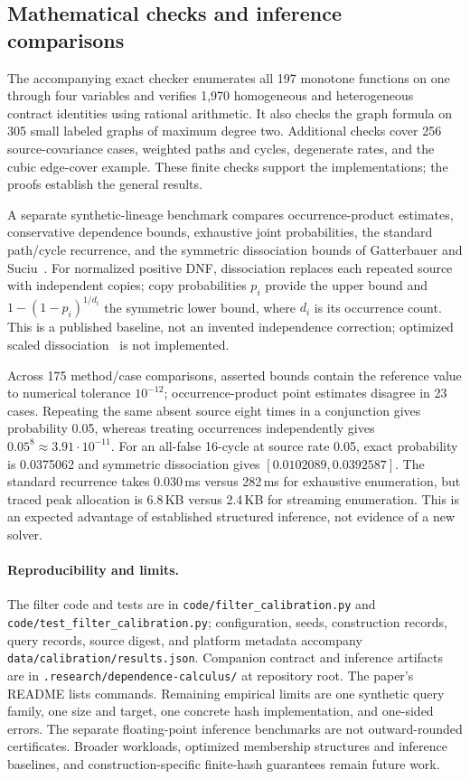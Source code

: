 \documentclass[../main.tex]{subfiles}
\begin{document}
\subsection{Mathematical checks and inference comparisons}
The accompanying exact checker enumerates all 197 monotone functions on
one through four variables and verifies 1,970 homogeneous and heterogeneous
contract identities using rational arithmetic. It also checks the graph
formula on 305 small labeled graphs of maximum degree two. Additional
checks cover 256 source-covariance cases, weighted paths and cycles,
degenerate rates, and the cubic edge-cover example. These finite checks
support the implementations; the proofs establish the general results.

A separate synthetic-lineage benchmark compares occurrence-product
estimates, conservative dependence bounds, exhaustive joint probabilities,
the standard path/cycle recurrence, and the symmetric dissociation bounds
of Gatterbauer and Suciu~\cite{gatterbauer2014bounds}. For normalized positive
DNF, dissociation replaces each repeated source with independent copies;
copy probabilities $p_i$ provide the upper bound and
$1-(1-p_i)^{1/d_i}$ the symmetric lower bound, where $d_i$ is its occurrence
count. This is a published baseline, not an invented independence correction;
optimized scaled dissociation~\cite{vandenheuvel2019scaled} is not implemented.

Across 175 method/case comparisons, asserted bounds contain the reference
value to numerical tolerance $10^{-12}$; occurrence-product point estimates
disagree in 23 cases. Repeating the same absent source eight times in a
conjunction gives probability 0.05, whereas treating occurrences independently
gives $0.05^8\approx3.91\cdot10^{-11}$. For an all-false 16-cycle at source
rate 0.05, exact probability is 0.0375062 and symmetric dissociation gives
$[0.0102089,0.0392587]$. The standard recurrence takes 0.030\,ms versus
282\,ms for exhaustive enumeration, but traced peak allocation is 6.8\,KB
versus 2.4\,KB for streaming enumeration. This is an expected advantage of
established structured inference, not evidence of a new solver.

\paragraph{Reproducibility and limits.}
The filter code and tests are in \texttt{code/filter\_calibration.py} and
\texttt{code/test\_filter\_calibration.py}; configuration, seeds, construction
records, query records, source digest, and platform metadata accompany
\texttt{data/calibration/results.json}. Companion contract and inference
artifacts are in \texttt{.research/}\allowbreak\texttt{dependence-calculus/}
at repository root. The paper's README lists
commands. Remaining empirical limits are one synthetic query family, one
size and target, one concrete hash implementation, and one-sided errors.
The separate floating-point inference benchmarks are not outward-rounded
certificates. Broader
workloads, optimized membership structures and inference baselines, and
construction-specific finite-hash guarantees remain future work.
\end{document}
